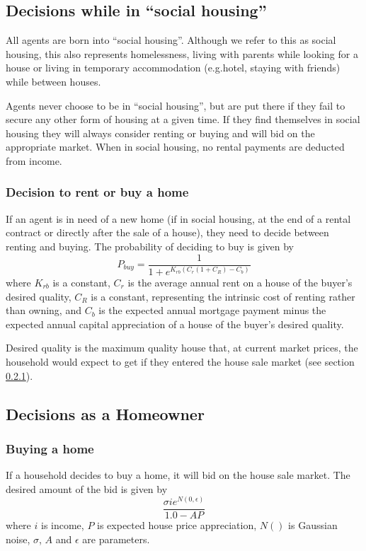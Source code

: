 \documentclass{article}
\begin{document}
\subsection{Decisions while in ``social housing''}
All agents are born into ``social housing''. Although we refer to this as social housing, this also represents homelessness, living with parents while looking for a house or living in temporary accommodation (e.g.hotel, staying with friends) while between houses.

Agents never choose to be in ``social housing'', but are put there if they fail to secure any other form of housing at a given time. If they find themselves in social housing they will always consider renting or buying and will bid on the appropriate market. When in social housing, no rental payments are deducted from income.

\subsubsection{Decision to rent or buy a home}
If an agent is in need of a new home (if in social housing, at the end of a rental contract or directly after the sale of a house), they need to decide between renting and buying. The probability of deciding to buy is given by
\[
P_{buy} = \frac{1}{1 + e^{K_{rb}(C_{r}(1+C_R) - C_{b})}}
\]
where $K_{rb}$ is a constant, $C_{r}$ is the average annual rent on a house of the buyer's desired quality, $C_R$ is a constant, representing the intrinsic cost of renting rather than owning, and $C_{b}$ is the expected annual mortgage payment minus the expected annual capital appreciation of a house of the buyer's desired quality.

Desired quality is the maximum quality house that, at current market prices, the household would expect to get if they entered the house sale market (see section \ref{buyahome}).

\subsection{Decisions as a Homeowner}

\subsubsection{Buying a home}
\label{buyahome}
If a household decides to buy a home, it will bid on the house sale market. The desired amount of the bid is given by
\[
 \frac{\sigma i e^{N(0,\epsilon)}}{1.0 - AP}
\]
where $i$ is income, $P$ is expected house price appreciation, $N()$ is Gaussian noise, $\sigma$, $A$ and $\epsilon$ are parameters.
\end{document}
